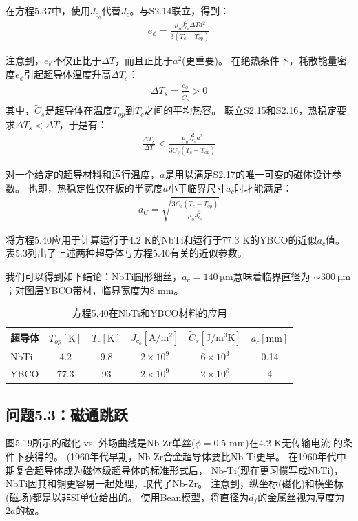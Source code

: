 在方程5.37中，使用$J_{c_o}$代替$J_c$。与S2.14联立，得到：
\begin{align*}%
e_{\phi}=\frac{\mu_{o}J_{c_{o}}^{2}\Delta T a^{2}}{3(T_{c}-T_{op})}\tag{S2.15}
\end{align*}

注意到，$e_{\phi}$不仅正比于$\Delta T$，而且正比于$a^2$(更重要)。
在绝热条件下，耗散能量密度$e_{\phi}$引起超导体温度升高$\Delta T_s$：
\begin{align*}%
\Delta T_{s}=\frac{e_{\phi}}{\tilde{C}_{s}}>0\tag{S2.16}
\end{align*}
其中，$\tilde{C}_{s}$是超导体在温度$T_{op}$到$T_c$之间的平均热容。
联立S2.15和S2.16，热稳定要求$\Delta T_s <\Delta T$，于是有：
\begin{align*}%
\frac{\Delta T_{s}}{\Delta T}<\frac{\mu_{o}J_{c_{o}}^{2}a^{2}}{3\tilde{C}_{s}(T_{c}-T_{op})}\tag{S2.17}
\end{align*}

对一个给定的超导材料和运行温度，$a$是用以满足S2.17的唯一可变的磁体设计参数。
也即，热稳定性仅在板的半宽度$a$小于临界尺寸$a_c$时才能满足：
\begin{align*}%
a_{C}=\sqrt{\frac{3\tilde{C}_{s}(T_{c}-T_{op})}{\mu_{o}J_{c_{o}}^{2}}}\tag{5.40}
\end{align*}

将方程5.40应用于计算运行于4.2 K的NbTi和运行于77.3 K的YBCO的近似$a_c$值。
 表5.3列出了上述两种超导体与方程5.40有关的近似参数。

我们可以得到如下结论：NbTi圆形细丝，$a_c=140\ \mathrm{\mu m}$意味着临界直径为
$\sim 300\ \mathrm{\mu m}$；对图层YBCO带材，临界宽度为8 mm。

\begin{table}[htbp]\small
\centering
\caption{方程5.40在NbTi和YBCO材料的应用} 
	\begin{tabular}{|l|c|c|c|c|c|}
		\hline
超导体& $T_{op}\left[\mathrm{K}\right]$    & $T_c\left[\mathrm{K}\right]$   & $J_{c_o}\left[\mathrm{A/m^2}\right]$ & $\tilde{C}_s\left[\mathrm{J/m^3K}\right]$ & $a_c\left[\mathrm{mm}\right]$    \\ \hline
		NbTi           & 4.2  & 9.8 & $2\times10^9$ & $6\times10^3$ & 0.14 \\ \hline
		YBCO           & 77.3 & 93  & $2\times10^9$ & $2\times10^6$ & 4    \\ \hline
	\end{tabular}
\end{table}


\subsection{问题5.3：磁通跳跃}
图5.19所示的磁化 vs. 外场曲线是Nb-Zr单丝($\phi=$0.5 mm)在4.2 K无传输电流
的条件下获得的。 (1960年代早期，Nb-Zr合金超导体要比Nb-Ti更早。
在1960年代中期复合超导体成为磁体级超导体的标准形式后，
Nb-Ti(现在更习惯写成NbTi)，NbTi因其和铜更容易一起处理，取代了Nb-Zr。
注意到，纵坐标(磁化)和横坐标(磁场)都是以非SI单位给出的。
使用Bean模型，将直径为$d_f$的金属丝视为厚度为$2a$的板。

